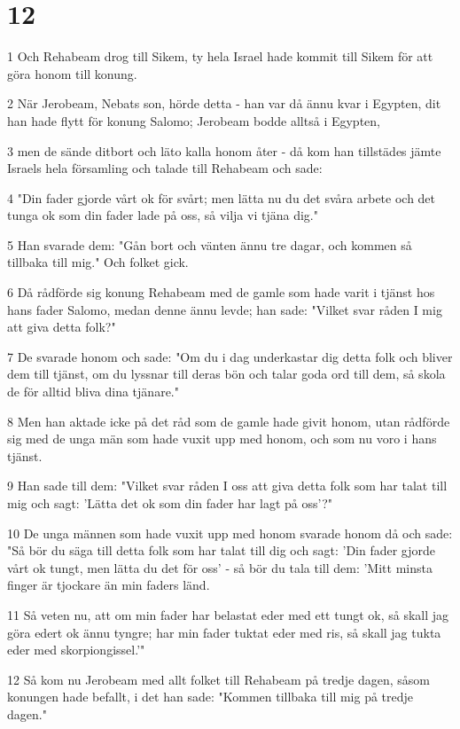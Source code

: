 \chapter{12}

\par 1 Och Rehabeam drog till Sikem, ty hela Israel hade kommit till Sikem för att göra honom till konung.
\par 2 När Jerobeam, Nebats son, hörde detta - han var då ännu kvar i Egypten, dit han hade flytt för konung Salomo; Jerobeam bodde alltså i Egypten,
\par 3 men de sände ditbort och läto kalla honom åter - då kom han tillstädes jämte Israels hela församling och talade till Rehabeam och sade:
\par 4 "Din fader gjorde vårt ok för svårt; men lätta nu du det svåra arbete och det tunga ok som din fader lade på oss, så vilja vi tjäna dig."
\par 5 Han svarade dem: "Gån bort och vänten ännu tre dagar, och kommen så tillbaka till mig." Och folket gick.
\par 6 Då rådförde sig konung Rehabeam med de gamle som hade varit i tjänst hos hans fader Salomo, medan denne ännu levde; han sade: "Vilket svar råden I mig att giva detta folk?"
\par 7 De svarade honom och sade: "Om du i dag underkastar dig detta folk och bliver dem till tjänst, om du lyssnar till deras bön och talar goda ord till dem, så skola de för alltid bliva dina tjänare."
\par 8 Men han aktade icke på det råd som de gamle hade givit honom, utan rådförde sig med de unga män som hade vuxit upp med honom, och som nu voro i hans tjänst.
\par 9 Han sade till dem: "Vilket svar råden I oss att giva detta folk som har talat till mig och sagt: 'Lätta det ok som din fader har lagt på oss'?"
\par 10 De unga männen som hade vuxit upp med honom svarade honom då och sade: "Så bör du säga till detta folk som har talat till dig och sagt: 'Din fader gjorde vårt ok tungt, men lätta du det för oss' - så bör du tala till dem: 'Mitt minsta finger är tjockare än min faders länd.
\par 11 Så veten nu, att om min fader har belastat eder med ett tungt ok, så skall jag göra edert ok ännu tyngre; har min fader tuktat eder med ris, så skall jag tukta eder med skorpiongissel.'"
\par 12 Så kom nu Jerobeam med allt folket till Rehabeam på tredje dagen, såsom konungen hade befallt, i det han sade: "Kommen tillbaka till mig på tredje dagen."
